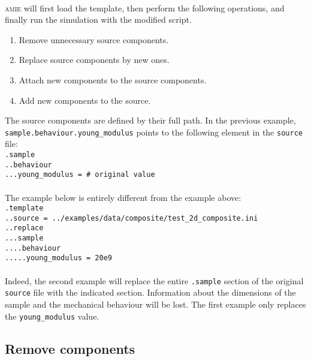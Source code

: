 \documentclass[10pt]{article}
\begin{document}
\paragraph{} \textsc{amie} will first load the template, then perform the following operations, and finally run the simulation with the modified script.

\begin{enumerate}
	\item Remove unnecessary source components.
	\item Replace source components by new ones.
	\item Attach new components to the source components.
	\item Add new components to the source.
\end{enumerate}

The source components are defined by their full path. In the previous example, \verb+sample.behaviour.young_modulus+ points to the following element in the \verb+source+ file:\\

\noindent \verb+.sample+\\
\verb+..behaviour+\\
\verb+...young_modulus = # original value+

\paragraph{} The example below is entirely different from the example above:\\

\noindent \verb+.template+\\
\verb+..source = ../examples/data/composite/test_2d_composite.ini+\\
\verb+..replace+\\
\verb+...sample+\\
\verb+....behaviour+\\
\verb+.....young_modulus = 20e9+

\paragraph{} Indeed, the second example will replace the entire \verb+.sample+ section of the original \verb+source+ file with the indicated section. Information about the dimensions of the sample and the mechanical behaviour will be lost. The first example only replaces the \verb+young_modulus+ value.

\subsection{Remove components}
\end{document}
